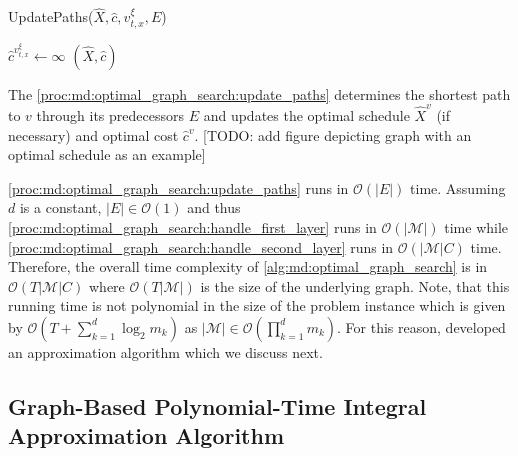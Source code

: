 \begin{function}
	\caption{UpdatePaths($\hat{X}, \hat{c}, v_{t,x}^{\xi}, E$)}\label{proc:md:optimal_graph_search:update_paths}
	$\hat{c}^{v_{t,x}^{\xi}} \gets \infty$\;
    \Return $(\hat{X}, \hat{c})$\;
\end{function}

The \autoref{proc:md:optimal_graph_search:update_paths} determines the shortest path to $v$ through its predecessors $E$ and updates the optimal schedule $\hat{X}^v$ (if necessary) and optimal cost $\hat{c}^v$. [TODO: add figure depicting graph with an optimal schedule as an example]

\ref{proc:md:optimal_graph_search:update_paths} runs in $\mathcal{O}(|E|)$ time. Assuming $d$ is a constant, $|E| \in \mathcal{O}(1)$ and thus \ref{proc:md:optimal_graph_search:handle_first_layer} runs in $\mathcal{O}(|\mathcal{M}|)$ time while \ref{proc:md:optimal_graph_search:handle_second_layer} runs in $\mathcal{O}(|\mathcal{M}| C)$ time. Therefore, the overall time complexity of \autoref{alg:md:optimal_graph_search} is in $\mathcal{O}(T |\mathcal{M}| C)$ where $\mathcal{O}(T |\mathcal{M}|)$ is the size of the underlying graph. Note, that this running time is not polynomial in the size of the problem instance which is given by $\mathcal{O}(T + \sum_{k=1}^d \log_2 m_k)$ as $|\mathcal{M}| \in \mathcal{O}(\prod_{k=1}^d m_k)$. For this reason, \citeauthor*{Albers2021_2} developed an approximation algorithm which we discuss next.

\subsection{Graph-Based Polynomial-Time Integral Approximation Algorithm}

